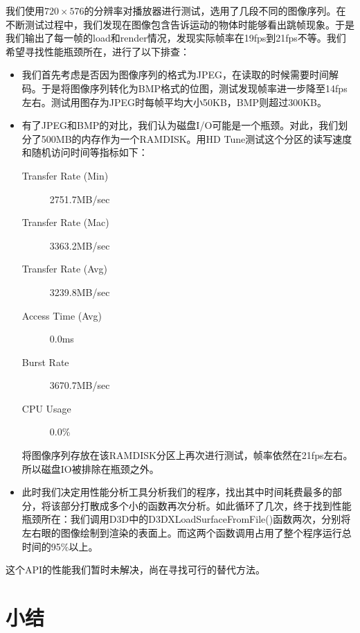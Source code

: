 我们使用$720\times576$的分辨率对播放器进行测试，选用了几段不同的图像序列。在不断测试过程中，我们发现在图像包含告诉运动的物体时能够看出跳帧现象。于是我们输出了每一帧的load和render情况，发现实际帧率在19fps到21fps不等。我们希望寻找性能瓶颈所在，进行了以下排查：
\begin{itemize}
\item 我们首先考虑是否因为图像序列的格式为JPEG，在读取的时候需要时间解码。于是将图像序列转化为BMP格式的位图，测试发现帧率进一步降至14fps左右。测试用图存为JPEG时每帧平均大小50KB，BMP则超过300KB。
\item 有了JPEG和BMP的对比，我们认为磁盘I/O可能是一个瓶颈。对此，我们划分了500MB的内存作为一个RAMDISK。用HD Tune测试这个分区的读写速度和随机访问时间等指标如下：
\begin{description}
\item[Transfer Rate (Min)] 2751.7MB/sec
\item[Transfer Rate (Mac)] 3363.2MB/sec
\item[Transfer Rate (Avg)] 3239.8MB/sec
\item[Access Time (Avg)] 0.0ms
\item[Burst Rate] 3670.7MB/sec
\item[CPU Usage] 0.0\%
\end{description}
将图像序列存放在该RAMDISK分区上再次进行测试，帧率依然在21fps左右。所以磁盘IO被排除在瓶颈之外。
\item 此时我们决定用性能分析工具分析我们的程序，找出其中时间耗费最多的部分，将该部分打散成多个小的函数再次分析。如此循环了几次，终于找到性能瓶颈所在：我们调用D3D中的D3DXLoadSurfaceFromFile()函数两次，分别将左右眼的图像绘制到渲染的表面上。而这两个函数调用占用了整个程序运行总时间的95\%以上。
\end{itemize}
这个API的性能我们暂时未解决，尚在寻找可行的替代方法。


\section{小结}
\label{sec:sum7}